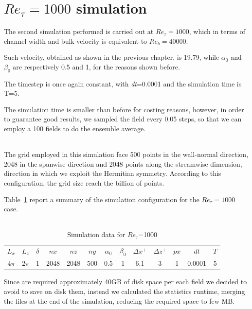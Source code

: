 \section{$Re_{\tau}=1000$ simulation} 
The second simulation performed is carried out at $Re_{\tau}=1000$, which in terms of channel width and bulk velocity is equivalent to $Re_{b}=40000$.\par
Such velocity, obtained as shown in the previous chapter, is 19.79, while $\alpha_{0}$ and $\beta_{0}$ are respectively 0.5 and 1, for the reasons shown before.\par
The timestep is once again constant, with \emph{dt}=0.0001 and the simulation time is T=5. \par
The simulation time is smaller than before for costing reasons, however, in order to guarantee good results, we sampled the field every 0.05 steps, so that we can employ a 100 fields to do the ensemble average.\\~\par
The grid employed in this simulation face 500 points in the wall-normal direction, 2048 in the spanwise direction and 2048 points along the streamwise dimension, direction in which we exploit the Hermitian symmetry. According to this configuration, the grid size reach the billion of points.\par
Table~\ref{table:1000} report a summary of the simulation configuration for the $Re_{\tau}=1000$ case.\\~\par

\begin{table}
\caption{Simulation data for $Re_{\tau}$=1000}
\begin{center}
\begin{tabular}{ccccccccccccc}
\toprule
$L_{x}$ & $L_{z}$ & $\delta$ & $nx$ & $nz$ & $ny$ & $\alpha_{0}$ & $\beta_{0}$ & $\Delta x^{+}$ & $\Delta z^{+}$ & $px$ & $dt$ & $T$\\
$4\pi$ & $2\pi$ & 1 & 2048 & 2048 & 500 & 0.5 & 1 & 6.1  & 3 & 1 & 0.0001 & 5 \\
\bottomrule
\end{tabular}
\end{center}
\label{table:1000}
\end{table}


Since are required approximately 40GB of disk space per each field we decided to avoid to save on disk them, instead we calculated the statistics runtime, merging the files at the end of the simulation, reducing the required space to few MB.\\~\par

